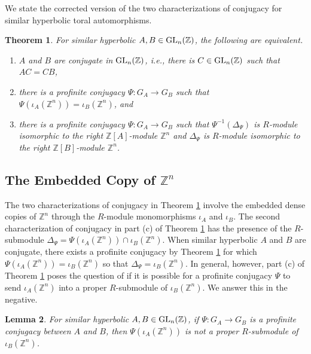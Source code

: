 \documentclass{amsart}
\theoremstyle{plain}
\newtheorem{theorem}{Theorem}[section]
\newtheorem{lemma}[theorem]{Lemma}
\theoremstyle{definition}
\theoremstyle{remark}
\begin{document}
We state the corrected version of the two characterizations of conjugacy for similar hyperbolic toral automorphisms.

\begin{theorem}\label{twochar}
For similar hyperbolic $A,B\in {\rm GL}_n({\mathbb Z})$, the following are equivalent.
\begin{enumerate}
\item[(a)] $A$ and $B$ are conjugate in ${\rm GL}_n({\mathbb Z})$, i.e., there is $C\in {\rm GL}_n({\mathbb Z})$ such that $AC=CB$,
\item[(b)] there is a profinite conjugacy $\Psi:G_A\to G_B$ such that $\Psi(\iota_A({\mathbb Z}^n)) = \iota_B({\mathbb Z}^n)$, and 
\item[(c)] there is a profinite conjugacy $\Psi:G_A\to G_B$ such that $\Psi^{-1}( \Delta_\Psi)$ is $R$-module isomorphic to the right ${\mathbb Z}[A]$-module ${\mathbb Z}^n$ and $\Delta_\Psi$ is $R$-module isomorphic to the right ${\mathbb Z}[B]$-module ${\mathbb Z}^n$.
\end{enumerate}
\end{theorem}


\subsection{The Embedded Copy of ${\mathbb Z}^n$}

The two characterizations of conjugacy in Theorem \ref{twochar} involve the embedded dense copies of ${\mathbb Z}^n$ through the $R$-module monomorphisms $\iota_A$ and $\iota_B$. The second characterization of conjugacy in part (c) of Theorem \ref{twochar} has the presence of the $R$-submodule $\Delta_\Psi=\Psi(\iota_A({\mathbb Z}^n))\cap\iota_B({\mathbb Z}^n)$. When similar hyperbolic $A$ and $B$ are conjugate, there exists a profinite conjugacy by Theorem \ref{twochar} for which $\Psi(\iota_A({\mathbb Z}^n)) = \iota_B({\mathbb Z}^n)$ so that $\Delta_\Psi = \iota_B({\mathbb Z}^n)$. In general, however, part (c) of Theorem \ref{twochar} poses the question of if it is possible for a profinite conjugacy $\Psi$ to send $\iota_A({\mathbb Z}^n)$ into a proper $R$-submodule of $\iota_B({\mathbb Z}^n)$. We answer this in the negative.

\begin{lemma}\label{properRsubmodule} For similar hyperbolic $A,B\in {\rm GL}_n({\mathbb Z})$, if $\Psi:G_A\to G_B$ is a profinite conjugacy between $A$ and $B$, then $\Psi(\iota_A({\mathbb Z}^n))$ is not a proper $R$-submodule of $\iota_B({\mathbb Z}^n)$.
\end{lemma}
\end{document}

